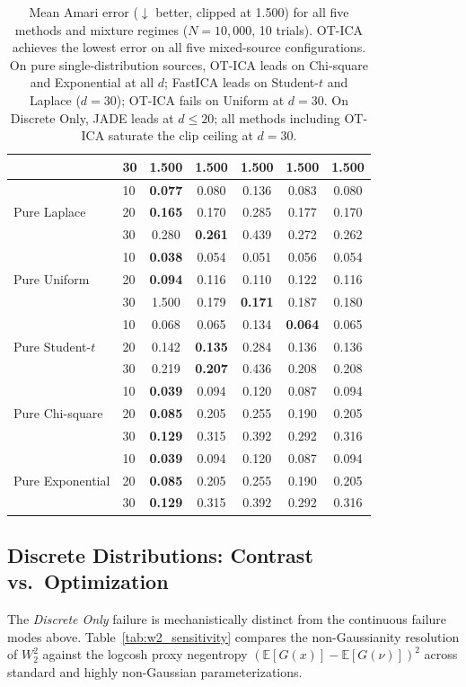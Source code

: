 \documentclass{tpm2026} %
\begin{document}
\begin{table}[htbp]
\begin{tabular}{llccccc}
 & 30 & 1.500 & 1.500 & 1.500 & 1.500 & 1.500 \\
\midrule
\multirow{3}{*}{Pure Laplace}
 & 10 & \textbf{0.077} & 0.080 & 0.136 & 0.083 & 0.080 \\
 & 20 & \textbf{0.165} & 0.170 & 0.285 & 0.177 & 0.170 \\
 & 30 & 0.280 & \textbf{0.261} & 0.439 & 0.272 & 0.262 \\
\midrule
\multirow{3}{*}{Pure Uniform}
 & 10 & \textbf{0.038} & 0.054 & 0.051 & 0.056 & 0.054 \\
 & 20 & \textbf{0.094} & 0.116 & 0.110 & 0.122 & 0.116 \\
 & 30 & 1.500 & 0.179 & \textbf{0.171} & 0.187 & 0.180 \\
\midrule
\multirow{3}{*}{Pure Student-$t$}
 & 10 & 0.068 & 0.065 & 0.134 & \textbf{0.064} & 0.065 \\
 & 20 & 0.142 & \textbf{0.135} & 0.284 & 0.136 & 0.136 \\
 & 30 & 0.219 & \textbf{0.207} & 0.436 & 0.208 & 0.208 \\
\midrule
\multirow{3}{*}{Pure Chi-square}
 & 10 & \textbf{0.039} & 0.094 & 0.120 & 0.087 & 0.094 \\
 & 20 & \textbf{0.085} & 0.205 & 0.255 & 0.190 & 0.205 \\
 & 30 & \textbf{0.129} & 0.315 & 0.392 & 0.292 & 0.316 \\
\midrule
\multirow{3}{*}{Pure Exponential}
 & 10 & \textbf{0.039} & 0.094 & 0.120 & 0.087 & 0.094 \\
 & 20 & \textbf{0.085} & 0.205 & 0.255 & 0.190 & 0.205 \\
 & 30 & \textbf{0.129} & 0.315 & 0.392 & 0.292 & 0.316 \\
\bottomrule
\end{tabular}
\caption{Mean Amari error ($\downarrow$ better, clipped at 1.500) for all five methods and mixture regimes ($N=10{,}000$, 10 trials). OT-ICA achieves the lowest error on all five mixed-source configurations. On pure single-distribution sources, OT-ICA leads on Chi-square and Exponential at all $d$; FastICA leads on Student-$t$ and Laplace ($d=30$); OT-ICA fails on Uniform at $d=30$. On Discrete Only, JADE leads at $d \le 20$; all methods including OT-ICA saturate the clip ceiling at $d=30$.}
\label{tab:full_amari_results}
\end{table}

\subsection{Discrete Distributions: Contrast vs.\ Optimization}
\label{app:discrete_contrast}
The \textit{Discrete Only} failure is mechanistically distinct from the continuous failure modes above. Table~\ref{tab:w2_sensitivity} compares
the non-Gaussianity resolution of $W_2^2$ against the logcosh proxy negentropy $(\mathbb{E}[G(x)]-\mathbb{E}[G(\nu)])^2$ across standard and highly non-Gaussian parameterizations.
\end{document}

